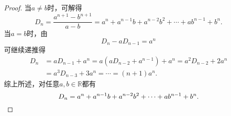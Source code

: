 \begin{example}
\begin{proof}
当\(a \neq b\)时，可解得\[
	D_n = \frac{a^{n+1} - b^{n+1}}{a - b}
	= a^n + a^{n-1} b + a^{n-2} b^2 + \dotsb + a b^{n-1} + b^n.
\]
当\(a = b\)时，由\[
	D_n - a D_{n-1} = a^n
\]可继续递推得\begin{align*}
	D_n &= a D_{n-1} + a^n
	= a(a D_{n-2} + a^{n-1}) + a^n
	= a^2 D_{n-2} + 2 a^n \\
	&= a^3 D_{n-3} + 3 a^n
	= \dotsb
	= (n+1) a^n.
\end{align*}
综上所述，对任意\(a,b\in\mathbb{R}\)都有\[
	D_n = a^n + a^{n-1} b + a^{n-2} b^2 + \dotsb + a b^{n-1} + b^n.
	\qedhere
\]
\end{proof}
\end{example}


